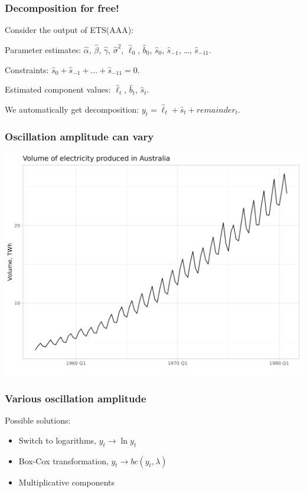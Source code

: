 \begin{frame}
	\frametitle{Decomposition for free!}
	
	Consider the output of ETS(AAA):
	
	\alert{Parameter estimates}: $\hat\alpha$, $\hat\beta$, $\hat\gamma$, $\hat\sigma^2$, $\hat\ell_0$, $\hat b_0$,
	$\hat s_0$, $\hat s_{-1}$, \ldots, $\hat s_{-11}$.
	
	Constraints: $\hat s_0 + \hat s_{-1} + \ldots + \hat s_{-11} = 0$.
	
	\pause
	Estimated \alert{component values}: $\hat \ell_t$, $\hat b_t$, $\hat s_t$.
	
	\pause
	We automatically get \alert{decomposition}: $y_t = \hat \ell_t + \hat s_t + remainder_t$.
	
\end{frame}











\begin{frame}
	\frametitle{Oscillation amplitude can vary}
	
	\includegraphics[width=\textwidth]{pictures/om_ts_03-033.png}
	
\end{frame}


\begin{frame}
	\frametitle{Various oscillation amplitude}
	
	Possible \alert{solutions}:
	\begin{itemize}[<+->]
		\item Switch to logarithms, $y_t \to \ln y_t$
		\item Box-Cox transformation, $y_t \to bc(y_t, \lambda)$
		\item Multiplicative components
	\end{itemize}
	
\end{frame}



